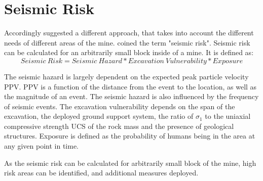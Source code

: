 
\section{Seismic Risk}

Accordingly \textcite{Heal10} suggested a different approach, that takes into account the different needs of different areas of the mine.\textcite{Heal10} coined the term "seismic risk". Seismic risk can be calculated for an arbitrarily small block inside of a mine. It is defined as:
\begin{equation*}
    Seismic~Risk =  Seismic~Hazard * Excavation ~Vulnerability * Exposure
\end{equation*}

The seismic hazard is largely dependent on the expected peak particle velocity PPV. PPV is a function of the distance from the event to the location, as well as the magnitude of an event. The seismic hazard is also influenced by the frequency of seismic events.
The excavation vulnerability depends on the span of the excavation, the deployed ground support system, the ratio of \(\sigma_1\) to the uniaxial compressive strength UCS of the rock mass and the presence of geological structures.
Exposure is defined as the probability of humans being in the area at any given point in time.

As the seismic risk can be calculated for arbitrarily small block of the mine, high risk areas can be identified, and additional measures deployed.